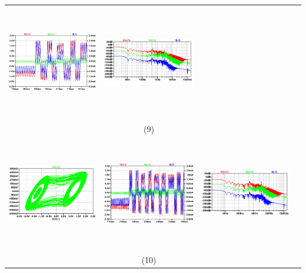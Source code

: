 \documentclass{rbf}
\begin{document}
\begin{table}[h]
\begin{tabular}{c c c c}
        \includegraphics[width=5cm,height=5cm]{R7/1419.44 C220 800m time series.png}&
        \includegraphics[width=5cm,height=5cm]{R7/1419.44 C220 800m fft.png}&\\
        & (9) &  \\
        \includegraphics[width=5cm,height=5cm]{R7/1419.61 C220 800m atractor.png}&
        \includegraphics[width=5cm,height=5cm]{R7/1419.61 C220 800m time series.png}&
        \includegraphics[width=5cm,height=5cm]{R7/1419.61 C220 800m fft.png}&\\
        & (10) &  \\
        \hline  
    \end{tabular}
\end{table}
\end{document}
